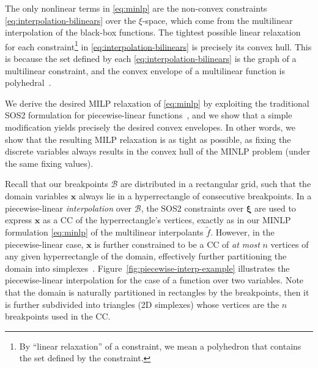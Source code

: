 \documentclass[pdflatex,sn-mathphys-num]{sn-jnl}%
\newcommand{\new}[1]{#1}
\begin{document}
\new{%
The only nonlinear terms in \ref{eq:minlp} are the non-convex constraints \eqref{eq:interpolation-bilinears} over the $\xi$-space, which come from the multilinear interpolation of the black-box functions.
The tightest possible linear relaxation for each constraint\footnote{By ``linear relaxation'' of a constraint, we mean a polyhedron that contains the set defined by the constraint.} in \eqref{eq:interpolation-bilinears} is precisely its convex hull.
This is because the set defined by each \eqref{eq:interpolation-bilinears} is the graph of a multilinear constraint, and the convex envelope of a multilinear function is  polyhedral~\citep{rikunConvexEnvelopeFormula1997,sundarPiecewisePolyhedralFormulations2021}.
}
We derive the desired MILP relaxation of \ref{eq:minlp} by exploiting the traditional SOS2 formulation for piecewise-linear functions~\citep{bealeTomlin1970,kehaModelsRepresentingPiecewise2004}\new{, and we show that a simple modification yields precisely the desired convex envelopes}.
\new{In other words, we show that the resulting MILP relaxation is as tight as possible, as fixing the discrete variables always results in the convex hull of the MINLP problem (under the same fixing values).}

\new{%
Recall that our breakpoints $\mathcal{B}$ are distributed in a rectangular grid, such that the domain variables $\bm{x}$ always lie in a hyperrectangle of consecutive breakpoints.
In a piecewise-linear \emph{interpolation} over $\mathcal{B}$, the SOS2 constraints over $\bm{\xi}$ are used to express $\bm{x}$ as a CC of the hyperrectangle's vertices, exactly as in our MINLP formulation \eqref{eq:minlp} of the multilinear interpolants $\widetilde{f}$.
However, in the piecewise-linear case, $\bm{x}$ is further constrained to be a CC of \emph{at most} $n$ vertices of any given hyperrectangle of the domain, effectively further partitioning the domain into simplexes~\citep{misenerPiecewiseLinearApproximationsMultidimensional2010}.
Figure~\ref{fig:piecewise-interp-example} illustrates the piecewise-linear interpolation for the case of a function over two variables.
Note that the domain is naturally partitioned in rectangles by the breakpoints, then it is further subdivided into triangles (2D simplexes) whose vertices are the $n$ breakpoints used in the CC.
}
\end{document}
